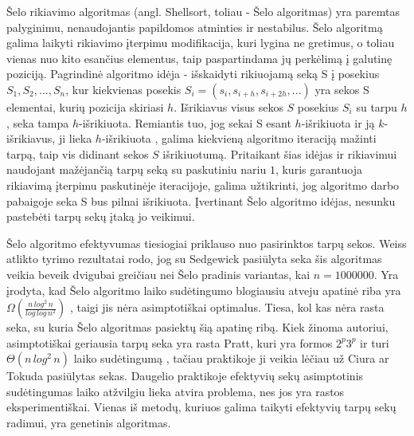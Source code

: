 \documentclass{VUMIFInfKursinis}
\begin{document}
Šelo rikiavimo algoritmas (angl. Shellsort, toliau - Šelo algoritmas) \cite{10.1145/368370.368387} yra paremtas palyginimu, nenaudojantis papildomos atminties ir nestabilus.
Šelo algoritmą galima laikyti rikiavimo įterpimu modifikacija,
kuri lygina ne gretimus, o toliau vienas nuo kito esančius elementus, taip paspartindama jų perkėlimą į galutinę poziciją.
Pagrindinė algoritmo idėja - išskaidyti rikiuojamą seką S į posekius $S_1, S_2, ..., S_n$,
kur kiekvienas posekis $S_i = (s_i, s_{i+h}, s_{i+2h}, ...)$ yra sekos S elementai, kurių pozicija skiriasi $h$.
Išrikiavus visus sekos $S$ posekius $S_i$ su tarpu $h$, seka tampa $h$-išrikiuota.
Remiantis tuo, jog sekai S esant $h$-išrikiuota ir ją $k$-išrikiavus, ji lieka $h$-išrikiuota \cite{GALE1972103},
galima kiekvieną algoritmo iteraciją mažinti tarpą, taip vis didinant sekos $S$ išrikiuotumą. %
Pritaikant šias idėjas ir rikiavimui naudojant mažėjančią tarpų seką su paskutiniu nariu $1$,
kuris garantuoja rikiavimą įterpimu paskutinėje iteracijoje,
galima užtikrinti, jog algoritmo darbo pabaigoje seka S bus pilnai išrikiuota.
Įvertinant Šelo algoritmo idėjas, nesunku pastebėti tarpų sekų įtaką jo veikimui.

Šelo algoritmo efektyvumas tiesiogiai priklauso nuo pasirinktos tarpų sekos.
Weiss atlikto tyrimo \cite{weiss1991short} rezultatai rodo, jog su Sedgewick pasiūlyta seka
šis algoritmas veikia beveik dvigubai greičiau nei Šelo pradinis variantas, kai $n = 1000000$.
Yra įrodyta, kad Šelo algoritmo laiko sudėtingumo blogiausiu atveju apatinė riba yra
$\Omega(\frac{n\,log^2\,n}{log\,log\,n^2})$ \cite{267769}, taigi jis nėra asimptotiškai optimalus.
Tiesa, kol kas nėra rasta seka, su kuria Šelo algoritmas pasiektų šią apatinę ribą.
Kiek žinoma autoriui, asimptotiškai geriausia tarpų seka yra rasta Pratt, kuri yra formos
$2^p3^p$ ir turi $\Theta(n\,log^2\,n)$ laiko sudėtingumą \cite{pratt1972shellsort},
tačiau praktikoje ji veikia lėčiau už Ciura \cite{ciura2001best} ar Tokuda \cite{10.5555/645569.659879} pasiūlytas sekas.
Daugelio praktikoje efektyvių sekų asimptotinis sudėtingumas laiko atžvilgiu lieka atvira problema,
nes jos yra rastos eksperimentiškai.
Vienas iš metodų, kuriuos galima taikyti efektyvių tarpų sekų radimui, yra genetinis algoritmas.
\end{document}
